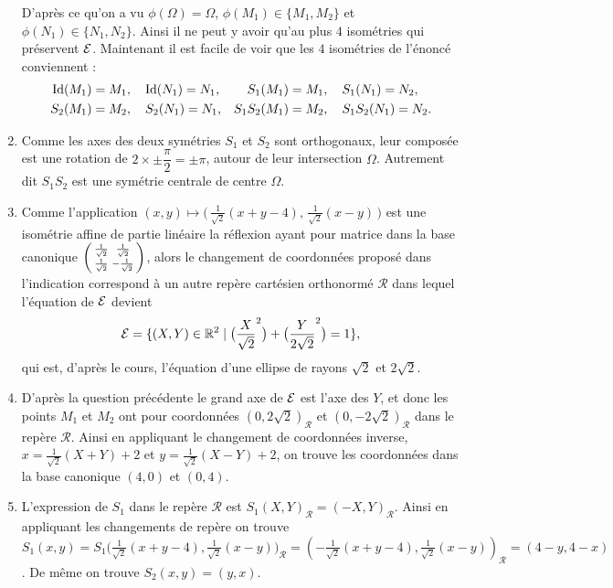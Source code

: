 \documentclass[a4paper,12pt,reqno]{amsart}
\begin{document}
\begin{solution}
\begin{enumerate}
    D'après ce qu'on a vu $\phi(\Omega) = \Omega$, $\phi(M_{1}) \in \{M_{1},M_{2}\}$ et $\phi(N_{1}) \in \{N_{1},N_{2}\}$. Ainsi il ne peut y avoir qu'au plus $4$ isométries qui préservent $\mathcal{E}$. Maintenant il est facile de voir que les $4$ isométries de l'énoncé conviennent :
    \begin{align*}
      \mathrm{Id}(M_{1})=M_{1}&,\quad \mathrm{Id}(N_{1})=N_{1}, &
      S_{1}(M_{1})=M_{1}&,\quad S_{1}(N_{1})=N_{2}, \\
      S_{2}(M_{1})=M_{2}&,\quad S_{2}(N_{1})=N_{1}, &
      S_{1}S_{2}(M_{1})=M_{2}&,\quad S_{1}S_{2}(N_{1})=N_{2}.
    \end{align*}
    \item Comme les axes des deux symétries $S_{1}$ et $S_{2}$ sont orthogonaux, leur composée est une rotation de $2\times \pm \dfrac{\pi}{2} = \pm \pi$, autour de leur intersection $\Omega$. Autrement dit $S_{1}S_{2}$ est une symétrie centrale de centre $\Omega$.
    \item Comme l'application $(x,y) \mapsto \big(\,\frac{1}{\sqrt{2}}(x+y-4),\,\frac{1}{\sqrt{2}}(x-y)\,\big)$ est une isométrie affine de partie linéaire la réflexion ayant pour matrice dans la base canonique
    $
      \begin{psmallmatrix}
        \frac{1}{\sqrt{2}} & \frac{1}{\sqrt{2}} \\
        \frac{1}{\sqrt{2}} & -\frac{1}{\sqrt{2}} \\
      \end{psmallmatrix}
    $, alors le changement de coordonnées proposé dans l'indication correspond à un autre repère cartésien orthonormé $\mathcal{R}$ dans lequel l'équation de $\mathcal{E}$ devient
    \[
      \mathcal{E}=\{ (X,Y) \in \mathbb{R}^{2} \mid \big(\frac{X}{\sqrt{2}}^{2}\big)+\big(\frac{Y}{2\sqrt{2}}^{2}\big)=1\},
    \]
    qui est, d'après le cours, l'équation d'une ellipse de rayons $\sqrt{2}$ et $2\sqrt{2}$.
    \item D'après la question précédente le grand axe de $\mathcal{E}$ est l'axe des $Y$, et donc les points $M_{1}$ et $M_{2}$ ont pour coordonnées $(0,2\sqrt{2})_{\mathcal{R}}$ et $(0,-2\sqrt{2})_{\mathcal{R}}$ dans le repère $\mathcal{R}$. Ainsi en appliquant le changement de coordonnées inverse, $x=\frac{1}{\sqrt{2}}(X+Y)+2$ et $y=\frac{1}{\sqrt{2}}(X-Y)+2$, on trouve les coordonnées dans la base canonique $(4,0)$ et $(0,4)$.
    \item L'expression de $S_{1}$ dans le repère $\mathcal{R}$ est $S_{1}(X,Y)_{\mathcal{R}}=(-X,Y)_{\mathcal{R}}$. Ainsi en appliquant les changements de repère on trouve $S_{1}(x,y) = S_{1}\big(\frac{1}{\sqrt{2}}(x+y-4), \frac{1}{\sqrt{2}}(x-y)\big)_{\mathcal{R}} = (-\frac{1}{\sqrt{2}}(x+y-4), \frac{1}{\sqrt{2}}(x-y))_{\mathcal{R}} = (4-y, 4-x)$. De même on trouve $S_{2}(x,y)=(y,x)$.
  \end{enumerate}
\end{solution}
\end{document}
